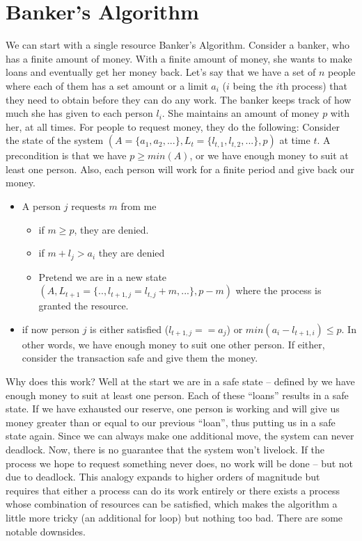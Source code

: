 \section{Banker's Algorithm}

We can start with a single resource Banker's Algorithm.
Consider a banker, who has a finite amount of money.
With a finite amount of money, she wants to make loans and eventually get her money back.
Let's say that we have a set of $n$ people where each of them has a set amount or a limit $a_i$ ($i$ being the $i$th process) that they need to obtain before they can do any work.
The banker keeps track of how much she has given to each person $l_i$. She maintains an amount of money $p$ with her, at all times.
For people to request money, they do the following:
Consider the state of the system $(A=\{a_1, a_2, ...\}, L_t=\{l_{t,1}, l_{t,2}, ...\}, p)$ at time $t$.
A precondition is that we have $p \geq min(A)$, or we have enough money to suit at least one person.
Also, each person will work for a finite period and give back our money.

\begin{itemize}
  \item A person $j$ requests $m$ from me
        \begin{itemize}
          \item if $m \geq p$, they are denied.
          \item if $m + l_j > a_i$ they are denied
          \item Pretend we are in a new state $(A, L_{t+1}=\{.., l_{t+1, j} = l_{t, j} + m, ...\}, p - m)$ where the process is granted the resource.
        \end{itemize}
  \item if now person $j$ is either satisfied ($l_{t+1,j} == a_j$) or $min(a_i - l_{t+1, i}) \leq p$. In other words, we have enough money to suit one other person. If either, consider the transaction safe and give them the money.
\end{itemize}

Why does this work? Well at the start we are in a safe state -- defined by we have enough money to suit at least one person.
Each of these ``loans'' results in a safe state.
If we have exhausted our reserve, one person is working and will give us money greater than or equal to our previous ``loan'', thus putting us in a safe state again.
Since we can always make one additional move, the system can never deadlock.
Now, there is no guarantee that the system won't livelock.
If the process we hope to request something never does, no work will be done -- but not due to deadlock.
This analogy expands to higher orders of magnitude but requires that either a process can do its work entirely or there exists a process whose combination of resources can be satisfied, which makes the algorithm a little more tricky (an additional for loop) but nothing too bad.
There are some notable downsides.

